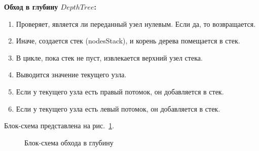 \documentclass[12pt, a4paper]{article}
\begin{document}
\textbf{Обход в глубину $DepthTree$:}
\begin{enumerate}
	\item Проверяет, является ли переданный узел нулевым. Если да, то 
	возвращается.
	\item Иначе, создается стек (nodesStack), и корень дерева помещается в стек.
	\item В цикле, пока стек не пуст, извлекается верхний узел стека.
	\item Выводится значение текущего узла.
	\item Если у текущего узла есть правый потомок, он добавляется в стек.
	\item Если у текущего узла есть левый потомок, он добавляется в стек.
\end{enumerate}
\newpage
Блок-схема представлена на рис.~\ref{img:grap2}.
	\begin{figure}[h]
  		\caption{Блок-схема обхода в глубину}
  		\label{img:grap2}
	\end{figure}
\newpage
\end{document}
